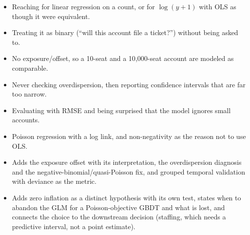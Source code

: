 \begin{interviewq}
\redflags
\begin{itemize}
    \item Reaching for linear regression on a count, or for $\log(y+1)$ with OLS as though it were equivalent.
    \item Treating it as binary (``will this account file a ticket?'') without being asked to.
    \item No exposure/offset, so a 10-seat and a 10{,}000-seat account are modeled as comparable.
    \item Never checking overdispersion, then reporting confidence intervals that are far too narrow.
    \item Evaluating with RMSE and being surprised that the model ignores small accounts.
\end{itemize}


\goodgreat
\begin{itemize}
    \item {} Poisson regression with a log link, and non-negativity as the reason not to use OLS.
    \item {} Adds the exposure offset with its interpretation, the overdispersion diagnosis and the negative-binomial/quasi-Poisson fix, and grouped temporal validation with deviance as the metric.
    \item {} Adds zero inflation as a distinct hypothesis with its own test, states when to abandon the GLM for a Poisson-objective GBDT and what is lost, and connects the choice to the downstream decision (staffing, which needs a predictive interval, not a point estimate).
\end{itemize}

\end{interviewq}

